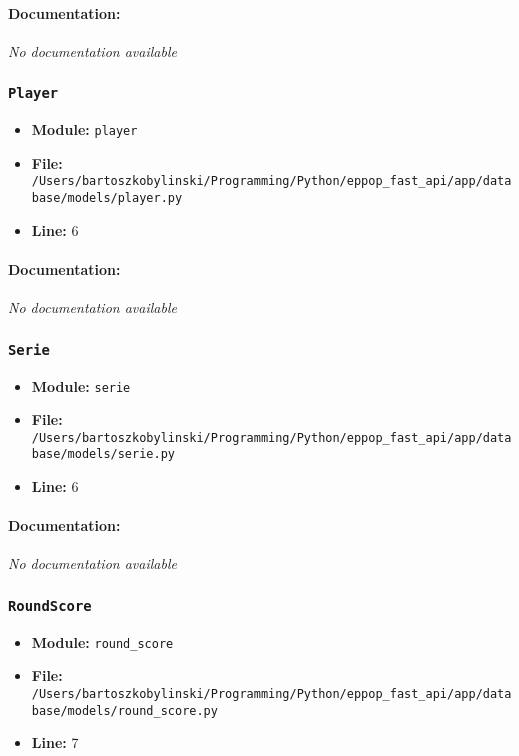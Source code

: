\documentclass[11pt,a4paper]{article}
\begin{document}
\paragraph{Documentation:} \textit{No documentation available}


\vspace{1em}
\subsubsection{\texttt{Player}}

\begin{itemize}
    \item \textbf{Module:} \texttt{player}
    \item \textbf{File:} \texttt{/Users/bartoszkobylinski/Programming/Python/eppop\_fast\_api/app/database/models/player.py}
    \item \textbf{Line:} 6
\end{itemize}

\paragraph{Documentation:} \textit{No documentation available}


\vspace{1em}
\subsubsection{\texttt{Serie}}

\begin{itemize}
    \item \textbf{Module:} \texttt{serie}
    \item \textbf{File:} \texttt{/Users/bartoszkobylinski/Programming/Python/eppop\_fast\_api/app/database/models/serie.py}
    \item \textbf{Line:} 6
\end{itemize}

\paragraph{Documentation:} \textit{No documentation available}


\vspace{1em}
\subsubsection{\texttt{RoundScore}}

\begin{itemize}
    \item \textbf{Module:} \texttt{round\_score}
    \item \textbf{File:} \texttt{/Users/bartoszkobylinski/Programming/Python/eppop\_fast\_api/app/database/models/round\_score.py}
    \item \textbf{Line:} 7
\end{itemize}
\end{document}
